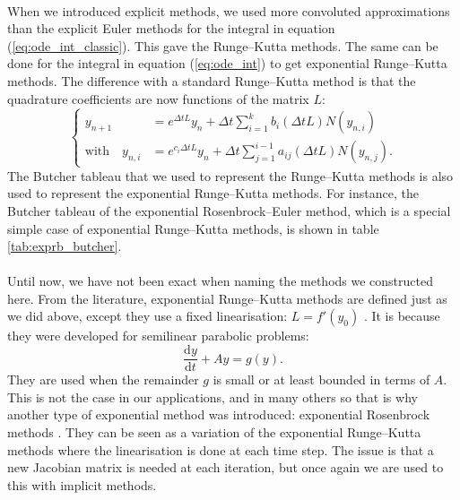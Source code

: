     \paragraph{}
    When we introduced explicit methods, we used more convoluted approximations than the explicit Euler methods for the integral in equation (\ref{eq:ode_int_classic}).
    This gave the Runge--Kutta methods.
    The same can be done for the integral in equation (\ref{eq:ode_int}) to get exponential Runge--Kutta methods.
    The difference with a standard Runge--Kutta method is that the quadrature coefficients are now functions of the matrix $L$:
    \begin{equation}
      \left\{\begin{aligned}
        y_{n+1} &= e^{\Delta t L} y_n + \Delta t \sum_{i = 1}^k b_i\left(\Delta t L\right) N\left(y_{n,i}\right) \\
        \textrm{with}\quad y_{n,i} &= e^{c_i \Delta t L} y_n + \Delta t \sum_{j = 1}^{i-1} a_{ij}\left(\Delta t L\right) N\left(y_{n,j}\right) .
      \end{aligned}\right.
    \end{equation}
    The Butcher tableau that we used to represent the Runge--Kutta methods is also used to represent the exponential Runge--Kutta methods.
    For instance, the Butcher tableau of the exponential Rosenbrock--Euler method, which is a special simple case of exponential Runge--Kutta methods, is shown in table \ref{tab:exprb_butcher}.

    \paragraph{}
    Until now, we have not been exact when naming the methods we constructed here.
    From the literature, exponential Runge--Kutta methods are defined just as we did above, except they use a fixed linearisation: $L = f'\left(y_0\right)$ \cite{HochbruckOstermann2005}.
    It is because they were developed for semilinear parabolic problems:
    \begin{equation}
      \frac{\mathrm{d} y}{\mathrm{d} t} + Ay = g\left(y\right) .
    \end{equation}
    They are used when the remainder $g$ is small or at least bounded in terms of $A$.
    This is not the case in our applications, and in many others so that is why another type of exponential method was introduced: exponential Rosenbrock methods \cite{HochbruckOstermannSchweitzer2006}.
    They can be seen as a variation of the exponential Runge--Kutta methods where the linearisation is done at each time step.
    The issue is that a new Jacobian matrix is needed at each iteration, but once again we are used to this with implicit methods.

